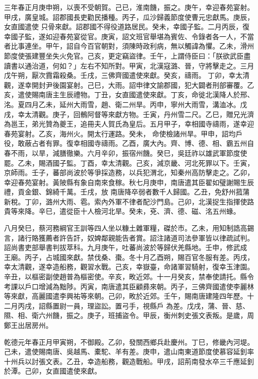 \begin{pinyinscope}
 三年春正月庚申朔，以喪不受朝賀。己已，淮南饑，振之。庚午，幸迎春苑宴射。甲戌，廣皇城。詔郡國長吏勸民播種。丙子，瓜沙歸義節度使曹元忠獻馬。庚辰，女直國遣使
 只骨來獻。詔郡國不得役道路居民。癸未，幸國子監。二月丙辰，復幸國子監，遂如迎春苑宴從官。庚寅，詔文班官舉堪為賓佐、令錄者各一人，不當者比事連坐。甲午，詔自今百官朝對，須陳時政利病，無以觸諱為懼。乙未，滑州節度使張建豐坐失火免官。己亥，更定竊盜律。壬午，上謂侍臣曰：「朕欲武臣盡讀書以通治道，何如？」左右不知所對。甲寅，北漢寇潞、晉，守將擊走之。三月戊午朔，厭次霣霜殺桑。壬戌，三佛齊國遣使來獻。癸亥，禱雨。
 丁卯，幸太清觀，遂幸開封尹後園宴射。己巳，大雨。詔申律文諭郡國，犯大闢者刑部審覆。乙亥，遣使賜南唐主生辰禮物。丁丑，女直國遣使來獻。丁亥，命徙北漢降人於邢、洺。夏四月乙未，延州大雨雪，趙、衛二州旱。丙申，寧州大雨雪，溝洫冰。戊戌，幸太清觀。庚子，回鶻阿督等來獻方物。壬寅，丹州雪二尺。乙巳，贈兄光濟為邕王，弟光贊為夔王，追冊夫人賀氏為皇后。五月甲子，幸相國寺禱雨，遂幸迎春苑宴射。乙亥，海州火。開太行運路。癸未，
 命使檢諸州旱。甲申，詔均戶役，敢蔽占者有罪。復幸相國寺禱雨。乙酉，廣大內。齊、博、德、相、霸五州自春不雨，以旱，減膳徹樂。六月辛卯，振宿州饑。癸巳，吳廷祚以雄武軍節度使罷。乙未，賜酒國子監。丁酉，幸太清觀。己亥，減京畿、河北死罪以下。壬寅，京師雨。壬子，蕃部尚波於等爭採造務，以兵犯渭北，知秦州高防擊走之。乙卯，幸迎春苑宴射。黃陂縣有象自南來食稼。秋七月庚申，南唐遣其臣翟如璧謝賜生辰禮，貢金銀、錦綺千萬。壬戌，放
 南唐降卒弱者數千人歸國。乙丑，免舒州菰蒲新稅。丁卯，潞州大雨、雹。索內外軍不律者配沙門島。己卯，北漢捉生指揮使路貴等來降。辛巳，遣從臣十人檢河北旱。癸未，兗、濟、德、磁、洺五州蝝。



 八月癸巳，蔡河務綱官王訓等四人坐以糠土雜軍糧，磔於市。乙未，用知制誥高錫言，諸行賂獲薦者許告訐，奴婢鄰親能告者賞。詔注諸道司法參軍皆以律疏試判。詔尚書吏部舉書判拔萃科。九月庚午，吐蕃尚波於等歸伏羌縣地。壬申，修武成
 王廟。丙子，占城國來獻。禁伐桑、棗。冬十月乙酉朔，賜百官冬服有差。丙戌，幸太清觀，遂幸造船務，觀習水戰。己亥，幸嶽臺，命諸軍習騎射，復幸玉津園。辛丑，以樞密副使趙普為樞密使。辛亥，畋近郊。十一月癸亥，禁奉使請托。縣令考課以戶口增減為黜陟。丙寅，南唐遣其臣顧彞來朝。丙子，三佛齊國遣使李麗林等來獻，高麗國遣李興祐等來朝。己卯，畋於近郊。壬午，賜南唐建隆四年歷。十二月丙戌，詔縣置尉一員，理盜訟。置弓手，視縣戶
 為差。戊戌，蒲、晉、慈、隰、相、衛六州饑，振之。庚子，班捕盜令。甲辰，衡州刺史張文表叛。是歲，周鄭王出居房州。



 乾德元年春正月甲寅朔，不御殿。乙卯，發關西鄉兵赴慶州。丁巳，修畿內河堤。己未，遣使賜南唐、吳越馬、橐駝、羊有差。庚申，遣山南東道節度使慕容延釗率十州兵以討張文表。乙丑，幸造船務，觀造戰船。甲戌，詔荊南發水卒三千應延釗於潭。己卯，女直國遣使來獻。




\end{pinyinscope}
